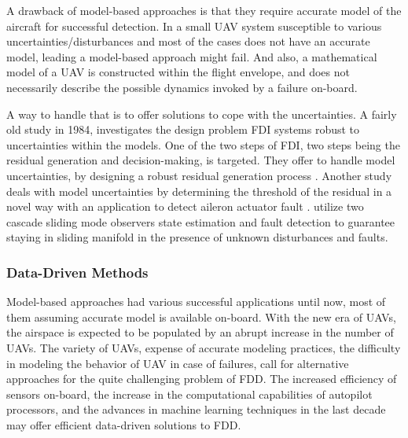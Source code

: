 

A drawback of model-based approaches is that they require accurate model of the 
aircraft for successful detection. In a small UAV system susceptible to various 
uncertainties/disturbances and most of the cases does not have an accurate model, 
leading a model-based approach might fail. And also, a mathematical model of a UAV 
is constructed within the flight envelope, and does not necessarily describe the 
possible dynamics invoked by a failure on-board.

A way to handle that is to offer solutions to cope with the uncertainties. 
A fairly old study in 1984, investigates the design problem FDI systems robust to 
uncertainties within the models. One of the two steps of FDI, two steps being the 
residual generation and decision-making, is targeted. They offer to handle model 
uncertainties, by designing a robust residual generation process \cite{chow1984analytical}. 
Another study deals with model uncertainties by determining the threshold of the residual 
in a novel way with an application to detect aileron actuator fault \cite{rotstein2006fault}. 
\cite{sharma2007fault} utilize two cascade sliding mode observers state estimation and 
fault detection to guarantee staying in sliding manifold in the presence of unknown 
disturbances and faults. 
%

\subsubsection{Data-Driven Methods}

Model-based approaches had various successful applications until now, 
most of them assuming accurate model is available on-board. With the new 
era of UAVs, the airspace is expected to be populated by an abrupt increase 
in the number of UAVs. The variety of UAVs, expense of accurate modeling 
practices, the difficulty in modeling the behavior of UAV in case of failures, 
call for alternative approaches for the quite challenging problem of FDD. 
The increased efficiency of sensors on-board, the increase in the computational 
capabilities of autopilot processors, and the advances in machine learning 
techniques in the last decade may offer efficient data-driven solutions to FDD.

